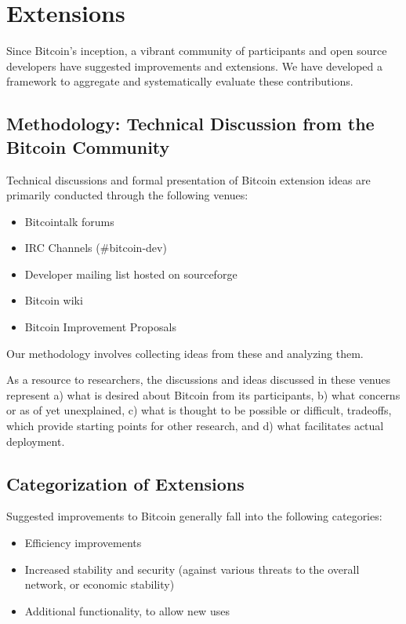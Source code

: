 \section{Extensions}

Since Bitcoin's inception, a vibrant community of participants and open source developers have suggested improvements and extensions. We have developed a framework to aggregate and systematically evaluate these contributions.

\subsection{Methodology: Technical Discussion from the Bitcoin Community}
Technical discussions and formal presentation of Bitcoin extension ideas are primarily conducted through the following venues:
\begin{itemize}
\item Bitcointalk forums
\item IRC Channels (\#bitcoin-dev)
\item Developer mailing list hosted on sourceforge
\item Bitcoin wiki
\item Bitcoin Improvement Proposals
\end{itemize}

Our methodology involves collecting ideas from these and analyzing them.

As a resource to researchers, the discussions and ideas discussed in these venues represent a) what is desired about Bitcoin from its participants, b) what concerns or as of yet unexplained, c) what is thought to be possible or difficult, tradeoffs, which provide starting points for other research, and d) what facilitates actual deployment.

\subsection{Categorization of Extensions}

Suggested improvements to Bitcoin generally fall into the following categories:
\begin{itemize}
\item Efficiency improvements
\item Increased stability and security (against various threats to the overall network, or economic stability)
\item Additional functionality, to allow new uses
\end{itemize}

